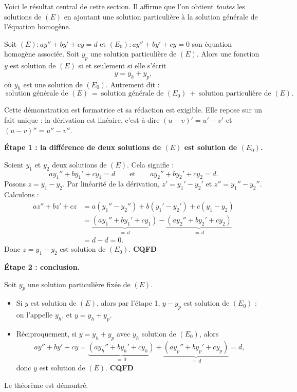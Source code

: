 \documentclass[11pt]{article}
\newcommand{\cle}[1]{{\popxbold\color{popdark}#1}}
\newcounter{popsec}
\newcounter{popsub}
\newcommand{\courssub}[1]{%
  \stepcounter{popsub}%
  \par\vspace{9pt}\noindent{\popxbold\fontsize{11.5}{13}\selectfont\color{popink}{\color{poporange}\thepopsec.\thepopsub}\hspace{6pt}#1}\par\nopagebreak\vspace{4pt}
}
\begin{document}
\courssub{Le théorème de structure : $y = y_h + y_p$}

Voici le résultat central de cette section. Il affirme que l'on obtient \emph{toutes} les solutions de $(E)$ en ajoutant une solution particulière à la solution générale de l'équation homogène.

\begin{propriete}
Soit $(E) : ay'' + by' + cy = d$ et $(E_0) : ay'' + by' + cy = 0$ son équation homogène associée. Soit $y_p$ une solution particulière de $(E)$. Alors une fonction $y$ est solution de $(E)$ si et seulement si elle s'écrit
\[
y = y_h + y_p,
\]
où $y_h$ est une solution de $(E_0)$. Autrement dit :
\[
\boxed{\ \text{solution générale de } (E) \ =\ \text{solution générale de } (E_0)\ +\ \text{solution particulière de } (E).\ }
\]
\end{propriete}

\begin{experience}
Cette démonstration est formatrice et sa rédaction est exigible. Elle repose sur un fait unique : la dérivation est \cle{linéaire}, c'est-à-dire $(u - v)' = u' - v'$ et $(u-v)'' = u'' - v''$.

\textbf{Étape 1 : la différence de deux solutions de $(E)$ est solution de $(E_0)$.}

Soient $y_1$ et $y_2$ deux solutions de $(E)$. Cela signifie :
\[
ay_1'' + by_1' + cy_1 = d \qquad \text{et} \qquad ay_2'' + by_2' + cy_2 = d.
\]
Posons $z = y_1 - y_2$. Par linéarité de la dérivation, $z' = y_1' - y_2'$ et $z'' = y_1'' - y_2''$. Calculons :
\begin{align*}
az'' + bz' + cz &= a(y_1'' - y_2'') + b(y_1' - y_2') + c(y_1 - y_2) \\
&= \underbrace{(ay_1'' + by_1' + cy_1)}_{=\, d} - \underbrace{(ay_2'' + by_2' + cy_2)}_{=\, d} \\
&= d - d = 0.
\end{align*}
Donc $z = y_1 - y_2$ est solution de $(E_0)$. \hfill \textbf{CQFD}

\textbf{Étape 2 : conclusion.}

Soit $y_p$ une solution particulière fixée de $(E)$.
\begin{itemize}
\item Si $y$ est solution de $(E)$, alors par l'étape 1, $y - y_p$ est solution de $(E_0)$ : on l'appelle $y_h$, et $y = y_h + y_p$.
\item Réciproquement, si $y = y_h + y_p$ avec $y_h$ solution de $(E_0)$, alors
\[
ay'' + by' + cy = \underbrace{(ay_h'' + by_h' + cy_h)}_{=\,0} + \underbrace{(ay_p'' + by_p' + cy_p)}_{=\,d} = d,
\]
donc $y$ est solution de $(E)$. \hfill \textbf{CQFD}
\end{itemize}
Le théorème est démontré.
\end{experience}
\end{document}
